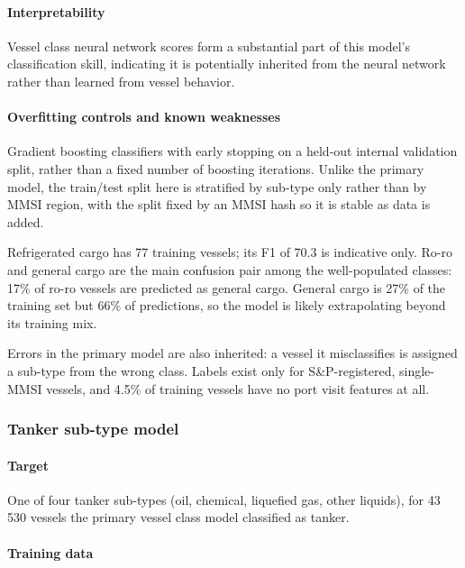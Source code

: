 \documentclass[lineno,pdflatex,sn-nature]{sn-jnl}
\begin{document}
\paragraph{Interpretability}

Vessel class neural network scores form a substantial part of this model's classification skill, indicating it is potentially inherited from the neural network rather than learned from vessel behavior.

\paragraph{Overfitting controls and known weaknesses}

Gradient boosting classifiers with early stopping on a held-out internal validation split, rather than a fixed number of boosting iterations. Unlike the primary model, the train/test split here is stratified by sub-type only rather than by MMSI region, with the split fixed by an MMSI hash so it is stable as data is added.

Refrigerated cargo has 77 training vessels; its F1 of 70.3 is indicative only. Ro-ro and general cargo are the main confusion pair among the well-populated classes: 17\% of ro-ro vessels are predicted as general cargo. General cargo is 27\% of the training set but 66\% of predictions, so the model is likely extrapolating beyond its training mix.

Errors in the primary model are also inherited: a vessel it misclassifies is assigned a sub-type from the wrong class. Labels exist only for S\&P-registered, single-MMSI vessels, and 4.5\% of training vessels have no port visit features at all.

\subsubsection{Tanker sub-type model}
\label{sec:tanker-submodel}

\paragraph{Target}

One of four tanker sub-types (oil, chemical, liquefied gas, other liquids), for 43\,530 vessels the primary vessel class model classified as tanker.

\paragraph{Training data}
\end{document}
